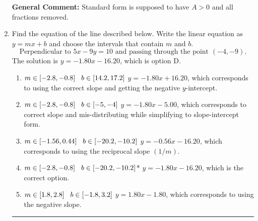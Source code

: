 \documentclass{extbook}[14pt]
\newcommand{\litem}[1]{\item#1\hspace*{-1cm}\rule{\textwidth}{0.4pt}}
\begin{document}
\begin{enumerate}
{\textbf{General Comment:} Standard form is supposed to have $A > 0$ and all fractions removed.
}
\litem{
Find the equation of the line described below. Write the linear equation as $ y=mx+b $ and choose the intervals that contain $m$ and $b$.
\[ \text{Perpendicular to } 5 x - 9 y = 10 \text{ and passing through the point } (-4, -9). \]
The solution is \( y = -1.80x - 16.20 \), which is option D.\begin{enumerate}[label=\Alph*.]
\item \( m \in [-2.8, -0.8] \hspace*{3mm} b \in [14.2, 17.2] \) $y = -1.80x + 16.20$, which corresponds to using the correct slope and getting the negative $y$-intercept.
\item \( m \in [-2.8, -0.8] \hspace*{3mm} b \in [-5, -4] \) $y = -1.80x - 5.00$, which corresponds to correct slope and mis-distributing while simplifying to slope-intercept form.
\item \( m \in [-1.56, 0.44] \hspace*{3mm} b \in [-20.2, -10.2] \) $y = -0.56x - 16.20$, which corresponds to using the reciprocal slope $(1/m)$.
\item \( m \in [-2.8, -0.8] \hspace*{3mm} b \in [-20.2, -10.2] \)* $y = -1.80x - 16.20$, which is the correct option.
\item \( m \in [1.8, 2.8] \hspace*{3mm} b \in [-1.8, 3.2] \) $y = 1.80x - 1.80$, which corresponds to using the negative slope.
\end{enumerate}

}
\end{enumerate}
\end{document}
